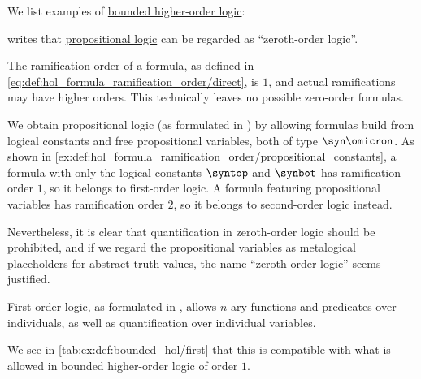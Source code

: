 \begin{example}\label{ex:def:bounded_hol}
  We list examples of \hyperref[def:bounded_hol]{bounded higher-order logic}:
  \begin{thmenum}
     \Textcite[201]{Andrews2002Logic} writes that \hyperref[def:propositional_logic]{propositional logic} can be regarded as \enquote{zeroth-order logic}.

    The ramification order of a formula, as defined in \eqref{eq:def:hol_formula_ramification_order/direct}, is \( 1 \), and actual ramifications may have higher orders. This technically leaves no possible zero-order formulas.

    We obtain propositional logic (as formulated in ) by allowing formulas build from logical constants and free propositional variables, both of type \( \syn\omicron \). As shown in \cref{ex:def:hol_formula_ramification_order/propositional_constants}, a formula with only the logical constants \( \syntop \) and \( \synbot \) has ramification order \( 1 \), so it belongs to first-order logic. A formula featuring propositional variables has ramification order \( 2 \), so it belongs to second-order logic instead.

    Nevertheless, it is clear that quantification in zeroth-order logic should be prohibited, and if we regard the propositional variables as metalogical placeholders for abstract truth values, the name \enquote{zeroth-order logic} seems justified.

     First-order logic, as formulated in , allows \( n \)-ary functions and predicates over individuals, as well as quantification over individual variables.

    We see in \cref{tab:ex:def:bounded_hol/first} that this is compatible with what is allowed in bounded higher-order logic of order \( 1 \).


\end{thmenum}
\end{example}
